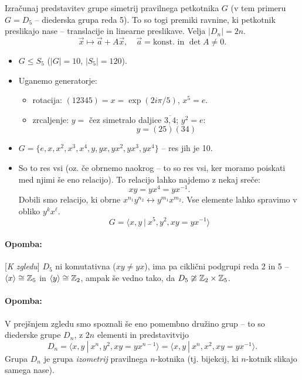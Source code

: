 \begin{zgled}
	Izra\v cunaj predstavitev grupe simetrij pravilnega petkotnika $G$ (v tem primeru $G = D_5$ -- diederska grupa reda 5).
	To so togi premiki ravnine, ki petkotnik preslikajo nase -- translacije in linearne preslikave. Velja $|D_n| = 2n$.
	\[
		\vec{x} \mapsto \vec{a} + A\vec{x},\quad \vec{a} = \text{konst. in } \det A \neq 0.
	\]
	\begin{itemize}
		\item{$G \leq S_5$ ($|G| = 10$, $|S_5| = 120$).}
		\item{Uganemo generatorje:
			\begin{itemize}
				\item{rotacija: $(12345)= x = \exp(2i\pi/5)$, $x^5 = e$.}
				\item{zrcaljenje: $y =$ \v cez simetralo daljice $\overline{3,4}$; $y^2 = e$:
					\[
						y = (25)(34)
					\]}
			\end{itemize}
		}
		\item{$G = \{e, x, x^2, x^3, x^4, y, yx, yx^2, yx^3, yx^4\}$ -- res jih je 10.}
		\item{So to res vsi (oz. \v ce obrnemo naokrog -- to so res vsi, ker moramo poiskati med njimi \v se eno relacijo).
			To relacijo lahko najdemo z nekaj sre\v ce:
			\[
				xy = yx^4 = yx^{-1}.
			\]
			Dobili smo relacijo, ki obrne $x^{n_1}y^{n_2} \leftrightarrow y^{m_1}x^{m_2}$. Vse elemente lahko spravimo
			v obliko $y^kx^\ell$.
			\[
				G = \langle x,y\ |\ x^5, y^2, xy = yx^{-1}\rangle
			\]}
	\end{itemize}
\end{zgled}

\paragraph{Opomba:} [{\em K zgledu}] $D_5$ ni komutativna ($xy \neq yx$), ima pa cikli\v cni podgrupi reda 2 in 5 -- $\langle x
\rangle \cong \mathbb{Z}_5$ in $\langle y \rangle \cong \mathbb{Z}_2$, ampak \v se vedno tako, da $D_5 \ncong \mathbb{Z}_2 \times \mathbb{Z}_5$.

\paragraph{Opomba:}
V prej\v snjem zgledu smo spoznali \v se eno pomembno dru\v zino grup -- to so diederske grupe $D_n$, z $2n$ elementi in
predstavitvijo
\[
	D_n = \langle x, y\ |\ x^n, y^2, xy = yx^{n-1} \rangle = \langle x, y\ |\ x^n, x^2, xy = yx^{-1} \rangle.
\]
Grupa $D_n$ je grupa \emph{izometrij} pravilnega $n$-kotnika (tj. bijekcij, ki $n$-kotnik slikajo samega nase).

